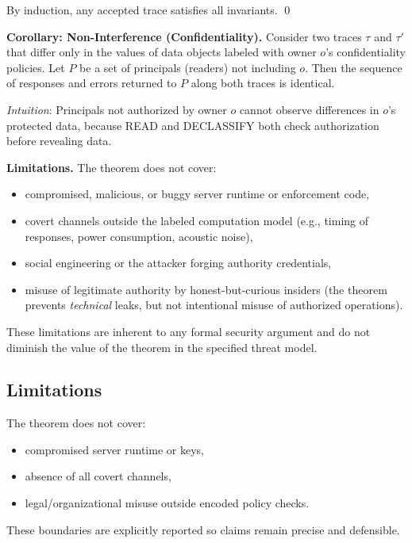 By induction, any accepted trace satisfies all invariants. \qed

\textbf{Corollary: Non-Interference (Confidentiality).}
Consider two traces $\tau$ and $\tau'$ that differ only in the values of data objects labeled with owner $o$'s confidentiality policies. Let $P$ be a set of principals (readers) not including $o$. Then the sequence of responses and errors returned to $P$ along both traces is identical.

\emph{Intuition}: Principals not authorized by owner $o$ cannot observe differences in $o$'s protected data, because READ and DECLASSIFY both check authorization before revealing data.

\textbf{Limitations.}
The theorem does not cover:
\begin{itemize}
    \item compromised, malicious, or buggy server runtime or enforcement code,
    \item covert channels outside the labeled computation model (e.g., timing of responses, power consumption, acoustic noise),
    \item social engineering or the attacker forging authority credentials,
    \item misuse of legitimate authority by honest-but-curious insiders (the theorem prevents \emph{technical} leaks, but not intentional misuse of authorized operations).
\end{itemize}

These limitations are inherent to any formal security argument and do not diminish the value of the theorem in the specified threat model.

\subsection{Limitations}

The theorem does not cover:
\begin{itemize}
    \item compromised server runtime or keys,
    \item absence of all covert channels,
    \item legal/organizational misuse outside encoded policy checks.
\end{itemize}

These boundaries are explicitly reported so claims remain precise and defensible.

